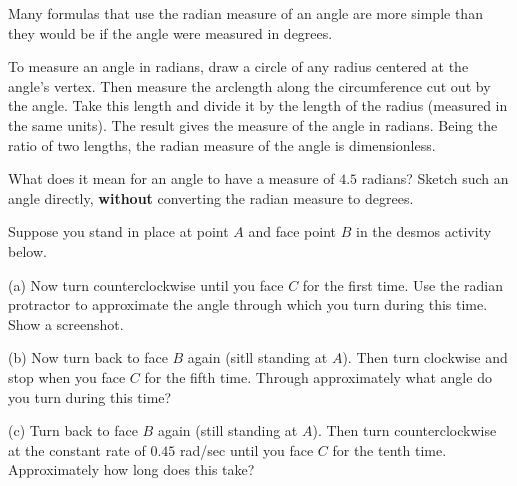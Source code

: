 \documentclass{ximera}
\begin{document}
Many formulas that use the radian measure of an angle are more simple than they would be if the angle were measured in degrees.

To measure an angle in radians, draw a circle of any radius centered at the angle's vertex. Then measure the arclength along the circumference cut out by the angle. Take this length and divide it by the length of the radius (measured in the same units). The result gives the measure of the angle in radians. Being the ratio of two lengths, the radian measure of the angle is dimensionless.


\begin{question} \label{Q1:Radians}
What does it mean for an angle to have a measure of $4.5$ radians? Sketch such an angle directly, {\bf without} converting the radian measure to degrees.
\end{question}



\begin{exploration}  \label{Q111:Radians}


 
\begin{onlineOnly}
    \begin{center}
\end{center}
\end{onlineOnly}
\end{exploration}






\begin{exploration}\label{exp:angles1}
Suppose you stand in place at point $A$ and face point $B$ in the desmos activity below. 

(a) Now turn counterclockwise until you face $C$ for the first time. Use the radian protractor to approximate the angle through which you turn during this time. Show a screenshot.

(b) Now turn back to face $B$ again (sitll standing at $A$). Then turn clockwise and stop when you face $C$ for the fifth time. Through approximately what angle do you turn during this time? 

(c) Turn back to face $B$ again (still standing at $A$). Then turn counterclockwise at the constant rate of $0.45$ rad/sec until you face $C$ for the tenth time. Approximately how long does this take? 


 
\begin{onlineOnly}
    \begin{center}
\end{center}
\end{onlineOnly}
\end{exploration}
\end{document}
